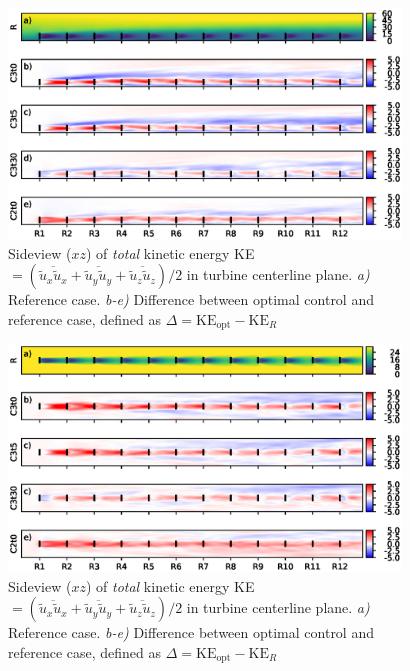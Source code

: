 		\begin{figure}[ht]
			\centering
			\includegraphics[width=0.93\textwidth]{chapters/optimal_induction_control/sideview_ke_total_side.eps}
			\caption{Sideview ($xz$) of \emph{total} kinetic energy KE $= (\overline{\widetilde{u}_x \widetilde{u}_x} + \overline{\widetilde{u}_y \widetilde{u}_y} + \overline{\widetilde{u}_z \widetilde{u}_z})/2$ in turbine centerline plane. \emph{a) } Reference case. \emph{b-e)} Difference between optimal control and reference case, defined as $\Delta = \text{KE}_{\text{opt}} - \text{KE}_{R}$  \label{fig:opt_ind_side_total_ke}}
		\end{figure}

		\begin{figure}[hbt]
			\centering
			\includegraphics[width=0.93\textwidth]{chapters/optimal_induction_control/topview_ke_total.eps}
			\caption{Sideview ($xz$) of \emph{total} kinetic energy KE $= (\overline{\widetilde{u}_x \widetilde{u}_x} + \overline{\widetilde{u}_y \widetilde{u}_y} + \overline{\widetilde{u}_z \widetilde{u}_z})/2$ in turbine centerline plane. \emph{a) } Reference case. \emph{b-e)} Difference between optimal control and reference case, defined as $\Delta = \text{KE}_{\text{opt}} - \text{KE}_{R}$  \label{fig:opt_ind_top_total_ke}}
		\end{figure}
	

